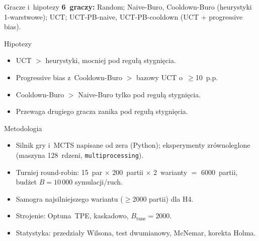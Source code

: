 \documentclass[aspectratio=169]{beamer}
\begin{document}
\begin{frame}{Gracze i~hipotezy}
\textbf{6~graczy:} Random; Naive-Buro, Cooldown-Buro (heurystyki 1-warstwowe);
UCT; UCT-PB-naive, UCT-PB-cooldown (UCT + progressive bias).
\begin{block}{Hipotezy}
\begin{itemize}\small
  \item[H1] UCT $>$ heurystyki, mocniej pod regułą stygnięcia.
  \item[H2] Progressive bias z~Cooldown-Buro $>$ bazowy UCT o~$\geq$10~p.p.
  \item[H3] Cooldown-Buro $>$ Naive-Buro tylko pod regułą stygnięcia.
  \item[H4] Przewaga drugiego gracza zanika pod regułą stygnięcia.
\end{itemize}
\end{block}
\end{frame}

\begin{frame}{Metodologia}
\begin{itemize}
  \item Silnik gry i~MCTS napisane od zera (Python); eksperymenty zrównoleglone
        (maszyna 128~rdzeni, \texttt{multiprocessing}).
  \item Turniej round-robin: 15~par $\times$ 200~partii $\times$ 2~warianty $=$ 6000~partii,
        budżet $B=10\,000$ symulacji/ruch.
  \item Samogra najsilniejszego wariantu ($\geq$2000 partii) dla H4.
  \item Strojenie: Optuna~TPE, kaskadowo, $B_{\text{tune}}=2000$.
  \item Statystyka: przedziały Wilsona, test dwumianowy, McNemar, korekta Holma.
\end{itemize}
\end{frame}
\end{document}
